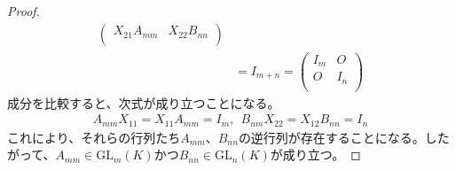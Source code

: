 \documentclass[dvipdfmx]{jsarticle}
\begin{document}
\begin{proof}
\begin{align*}
\begin{pmatrix}
X_{21}A_{mm} & X_{22}B_{nn} \\
\end{pmatrix}\\
&= I_{m + n} = \begin{pmatrix}
I_{m} & O \\
O & I_{n} \\
\end{pmatrix}
\end{align*}
成分を比較すると、次式が成り立つことになる。
\begin{align*}
A_{mm}X_{11} = X_{11}A_{mm} = I_{m},\ \ B_{nm}X_{22} = X_{12}B_{nn} = I_{n}
\end{align*}
これにより、それらの行列たち$A_{mm}$、$B_{nn}$の逆行列が存在することになる。したがって、$A_{mm} \in {\mathrm{GL}}_{m}(K)$かつ$B_{nn} \in {\mathrm{GL}}_{n}(K)$が成り立つ。
\end{proof}
\end{document}
